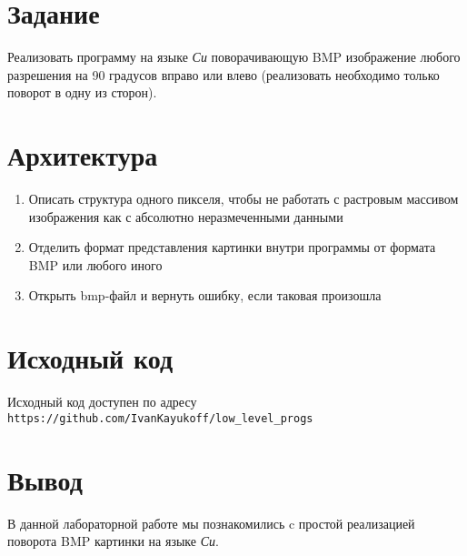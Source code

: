 \documentclass[listings]{labreport}
\begin{document}
\maketitlepage

\section*{Задание}

Реализовать программу на языке \textit{Си} поворачивающую BMP изображение 
любого разрешения на 90 градусов вправо или влево (реализовать необходимо
только поворот в одну из сторон).

\section*{Архитектура}

\begin{enumerate}
  \item Описать структура одного пикселя, чтобы не работать с растровым 
    массивом изображения как с абсолютно неразмеченными данными
  \item Отделить формат представления картинки внутри программы от формата
    BMP или любого иного
  \item Открыть bmp-файл и вернуть ошибку, если таковая произошла
\end{enumerate}

\section*{Исходный код}

Исходный код доступен по адресу 
\texttt{https://github.com/IvanKayukoff/low\_level\_progs}

\section*{Вывод}

В данной лабораторной работе мы познакомились c простой реализацией поворота
BMP картинки на языке \textit{Си}.
\end{document}
